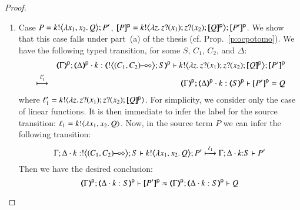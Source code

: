 \begin{proof}
\begin{enumerate}[1.]
\item Case $P =  \bbout{k}{\abs{x_1,x_2} Q} P' $, 
$\map{P}^{\mathsf{p}} = 
		\bbout{k}{\abs{z}\binp{z}{x_1}\binp{z}{x_2} \map{Q}^{\mathsf{p}}} \map{P'}^{\mathsf{p}}$.
		We show that this case falls under part~(a) of the thesis (cf. Prop.~\ref{p:ocpotomo}). 
		We have the following  typed transition, for some $S$, $C_1$, $C_2$, and $\Delta$:
\begin{eqnarray*}
& & \mapt{\Gamma}^{\mathsf{p}}; 
\mapt{\Delta}^{\mathsf{p}}\cat k:\tmap{\bbtout{\lhot{(C_1,  C_2)}} S}{\mathsf{p}}
\proves 
\bbout{k}{\abs{z}\binp{z}{x_1}\binp{z}{x_2} \map{Q}^{\mathsf{p}}} \map{P'}^{\mathsf{p}} \\
& \hby{\ell'_1} & 
\mapt{\Gamma}^{\mathsf{p}}; 
\mapt{\Delta}^{\mathsf{p}}\cat k:\tmap{ S}{\mathsf{p}} 
\proves 
\map{P'}^{\mathsf{p}} = Q
\end{eqnarray*}
where
$\ell'_1 = \bactout{k}{\abs{z}\binp{z}{x_1} \binp{z}{x_2} \map{Q}^{\mathsf{p}}}$.
For simplicity, we consider only the case of linear functions.
It is then immediate to infer the label for the source transition:
$\ell_1 = \bactout{k}{\abs{x_1,  x_2}{Q}} $. 
Now, in the source term $P$ we can infer the following transition:
$$
\stytra{\Gamma}{\ell_1}{\Delta\cat k:\bbtout{\lhot{(C_1,  C_2)}} S}{ \bbout{k}{\abs{x_1,x_2} Q} P'}{\Delta\cat k{:}S}{P'}
$$
Then we have the desired conclusion:
$$\wbb{\mapt{\Gamma}^{\mathsf{p}}}{\ell}{\mapt{\Delta\cat k:S}^{\mathsf{p}}}{\map{P'}^{\mathsf{p}}}{\mapt{\Delta\cat k:S}^{\mathsf{p}}}{Q}$$



\end{enumerate}
\end{proof}
